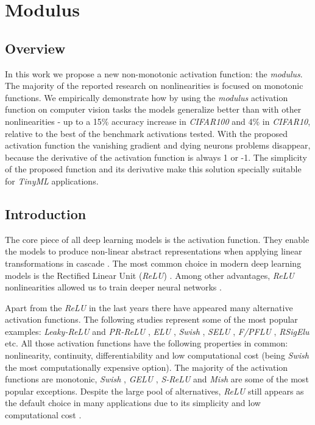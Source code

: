 \chapter{Modulus} \label{ch:modulus}

\section{Overview}
In this work we propose a new non-monotonic activation function: the \textit{modulus}. The majority of the reported research on nonlinearities is focused on monotonic functions. We empirically demonstrate how by using the \textit{modulus} activation function on computer vision tasks the models generalize better than with other nonlinearities - up to a 15\% accuracy increase in \textit{CIFAR100} and 4\% in \textit{CIFAR10}, relative to the best of the benchmark activations tested. With the proposed activation function the vanishing gradient and dying neurons problems disappear, because the derivative of the activation function is always 1 or -1. The simplicity of the proposed function and its derivative make this solution specially suitable for \textit{TinyML} applications.



\section{Introduction}
The core piece of all deep learning models is the activation function. They enable the models to produce non-linear abstract representations when applying linear transformations in cascade \cite{Goodfellow2016}. The most common choice in modern deep learning models is the Rectified Linear Unit (\textit{ReLU}) \cite{nair2010}. Among other advantages, \textit{ReLU} nonlinearities allowed us to train deeper neural networks \cite{xu2015}.

Apart from the \textit{ReLU} in the last years there have appeared many alternative activation functions. The following studies represent some of the most popular examples: \textit{Leaky-ReLU} and \textit{PR-ReLU} \cite{xu2015}, \textit{ELU} \cite{djork2016}, \textit{Swish} \cite{ramachandran2018}, \textit{SELU} \cite{klambauer2017}, \textit{F/PFLU} \cite{zhu2020}, \textit{RSigElu} \cite{Kilicarslan2021} etc. All those activation functions have the following properties in common: nonlinearity, continuity, differentiability and low computational cost (being \textit{Swish} the most computationally expensive option). The majority of the activation functions are monotonic, \textit{Swish} \cite{ramachandran2018}, \textit{GELU} \cite{hendrycks2016},  \textit{S-ReLU} \cite{Jin2016} and \textit{Mish} \cite{misra2019mish} are some of the most popular exceptions. Despite the large pool of alternatives, \textit{ReLU} still appears as the default choice in many applications due to its simplicity and low computational cost \cite{nair2010}.

